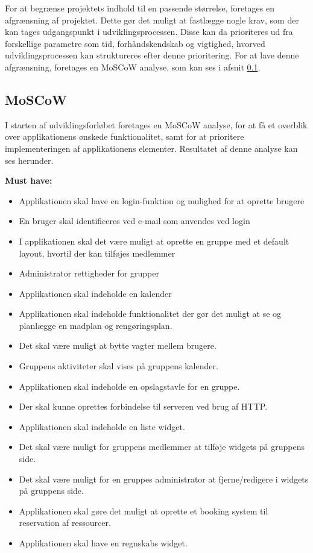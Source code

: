 For at begrænse projektets indhold til en passende størrelse, foretages en afgrænsning af projektet. Dette gør det muligt at fastlægge nogle krav, som der kan tages udgangspunkt i udviklingsprocessen. Disse kan da prioriteres ud fra forskellige parametre som tid, forhåndskendskab og vigtighed, hvorved udviklingsprocessen kan struktureres efter denne prioritering. For at lave denne afgrænsning, foretages en MoSCoW analyse, som kan ses i afsnit \ref{sec:MoSCoW}.

\subsection{MoSCoW} \label{sec:MoSCoW}
I starten af udviklingsforløbet foretages en MoSCoW analyse, for at få et overblik over applikationens ønskede funktionalitet, samt for at prioritere implementeringen af applikationens elementer. Resultatet af denne analyse kan ses herunder.

\noindent \textbf{Must have:}
\begin{itemize}
    \item Applikationen skal have en login-funktion og mulighed for at oprette brugere
    \item En bruger skal identificeres ved e-mail som anvendes ved login
    \item I applikationen skal det være muligt at oprette en gruppe med et default layout, hvortil der kan tilføjes medlemmer
    \item Administrator rettigheder for grupper
    \item Applikationen skal indeholde en kalender
    \item Applikationen skal indeholde funktionalitet der gør det muligt at se og planlægge en madplan og rengøringsplan.
    \item Det skal være muligt at bytte vagter mellem brugere. 
    \item Gruppens aktiviteter skal vises på gruppens kalender.
    \item Applikationen skal indeholde en opslagstavle for en gruppe.
    \item Der skal kunne oprettes forbindelse til serveren ved brug af HTTP.
    \item Applikationen skal indeholde en liste widget.
    \item Det skal være muligt for gruppens medlemmer at tilføje widgets på gruppens side.
    \item Det skal være muligt for en gruppes administrator at fjerne/redigere i widgets på gruppens side.
    \item Applikationen skal gøre det muligt at oprette et booking system til reservation af ressourcer.
    \item Applikationen skal have en regnskabs widget.
\end{itemize}

